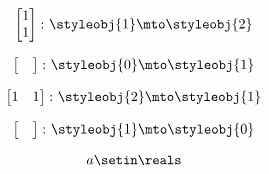 {\begin{forslides}
    \begin{equation}
        \label{eq:parallelism-111}
        \begin{bmatrix}
            1 \\
            1
        \end{bmatrix}
        \colon \styleobj{1} \mto \styleobj{2}
    \end{equation}

    \begin{equation}
        \label{eq:parallelism-112}
        \begin{bmatrix}
            \quad
        \end{bmatrix}
        \colon \styleobj{0} \mto \styleobj{1}
    \end{equation}

    \begin{equation}
        \label{eq:parallelism-113}
        \begin{bmatrix}
            1 & 1
        \end{bmatrix}
        \colon \styleobj{2} \mto \styleobj{1}
    \end{equation}

    \begin{equation}
        \label{eq:parallelism-114}
        \begin{bmatrix}
            \quad
        \end{bmatrix}
        \colon \styleobj{1} \mto \styleobj{0}
    \end{equation}

    \begin{equation}
        \label{eq:parallelism-115}
        a \setin \reals
    \end{equation}






\end{forslides}}
